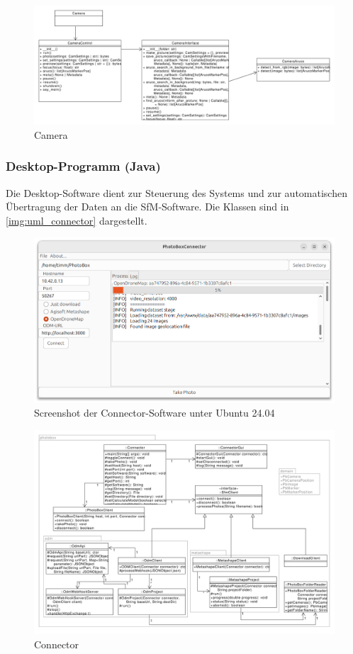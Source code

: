 \documentclass[./00PhotoBox.tex]{subfiles}
\begin{document}
\begin{figure}
    \centering
    \includegraphics[width=1\textwidth]{./img/uml/uml_camera_classdiagramm.pdf}
    \centering
    \caption{Camera} %
    \label{img:uml_camera} %
\end{figure}


\subsubsection{Desktop-Programm (Java)}
Die Desktop-Software dient zur Steuerung des Systems und zur automatischen Übertragung der Daten an die \gls{SfM}-Software. Die Klassen sind in \autoref{img:uml_connector} dargestellt.


\begin{figure}
    \centering
    \includegraphics[width=1\textwidth]{./img/connector_screenshot.png}
    \centering
    \caption{Screenshot der Connector-Software unter Ubuntu 24.04} %
    \label{img:screenshot_connector} %
\end{figure}

\begin{figure}
    \centering
    \includegraphics[width=1\textwidth]{./img/uml/uml_connector_classdiagramm.pdf}
    \centering
    \caption{Connector} %
    \label{img:uml_connector} %
\end{figure}

\biblio
\end{document}
